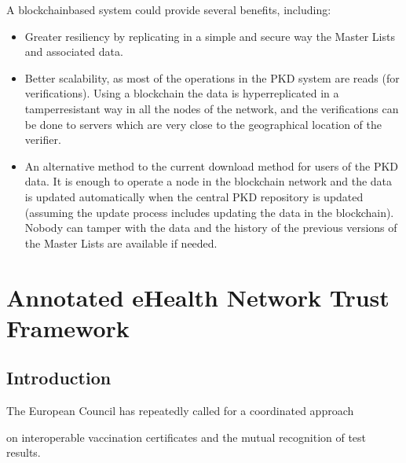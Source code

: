 \documentclass[a4paper,12pt,english]{sphinxhowto}
\begin{document}
\sphinxAtStartPar
A blockchain\sphinxhyphen{}based system could provide several benefits, including:
\begin{itemize}
\item {} 
\sphinxAtStartPar
Greater resiliency by replicating in a simple and secure way the Master Lists and associated data.

\item {} 
\sphinxAtStartPar
Better scalability, as most of the operations in the PKD system are reads (for verifications). Using a blockchain the data is hyper\sphinxhyphen{}replicated in a tamper\sphinxhyphen{}resistant way in all the nodes of the network, and the verifications can be done to servers which are very close to the geographical location of the verifier.

\item {} 
\sphinxAtStartPar
An alternative method to the current download method for users of the PKD data. It is enough to operate a node in the blockchain network and the data is updated automatically when the central PKD repository is updated (assuming the update process includes updating the data in the blockchain). Nobody can tamper with the data and the history of the previous versions of the Master Lists are available if needed.

\end{itemize}


\section{Annotated eHealth Network Trust Framework}
\label{\detokenize{ssi/annotehealth:annotated-ehealth-network-trust-framework}}\label{\detokenize{ssi/annotehealth::doc}}

\subsection{Introduction}
\label{\detokenize{ssi/annotehealth:introduction}}
\sphinxAtStartPar
The European Council has repeatedly called for a coordinated approach%
\begin{footnote}[1]\sphinxAtStartFootnote
{}
%
\end{footnote} on interoperable vaccination certificates and the mutual recognition of test results.
\end{document}

